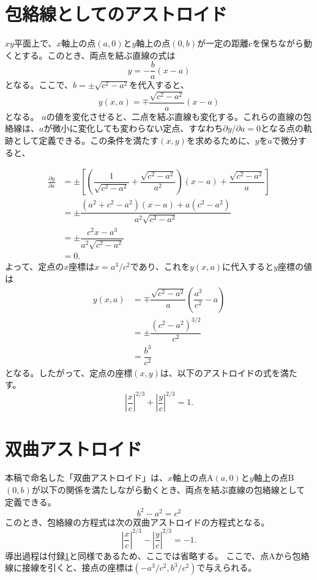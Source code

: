 \documentclass[twocolumn]{article}
\begin{document}
	
\appendix
\newcommand{\pd}[2]{{\frac{\partial #1}{\partial #2}}}
\newcommand{\ilpd}[2]{{{\partial #1}/{\partial #2}}}
\section{包絡線としてのアストロイド} \label{app:astroid}
$xy$平面上で、$x$軸上の点$(a, 0)$と$y$軸上の点$(0, b)$が一定の距離$c$を保ちながら動くとする。このとき、両点を結ぶ直線の式は
$$y=-\dfrac{b}{a}(x-a)$$
となる。ここで、$b=\pm \sqrt{c^2-a^2}$を代入すると、
$$y(x, a) = \mp \dfrac{\sqrt{c^2-a^2}}{a}(x-a)$$
となる。
$a$の値を変化させると、二点を結ぶ直線も変化する。これらの直線の包絡線は、$a$が微小に変化しても変わらない定点、すなわち$\ilpd{y}{a} = 0$となる点の軌跡として定義できる。この条件を満たす$(x, y)$を求めるために、$y$を$a$で微分すると、

$$ \begin{aligned}
	\pd{y}{a} &= \pm\left[\left( \dfrac{1}{\sqrt{c^2-a^2}}+\dfrac{\sqrt{c^2-a^2}}{a^2}\right) (x-a) + \dfrac{\sqrt{c^2-a^2}}{a} \right]\\
	&= \pm \dfrac{(a^2+c^2-a^2)(x-a)+a(c^2-a^2)}{a^2\sqrt{c^2-a^2}}\\
	&= \pm \dfrac{c^2 x - a^3}{a^2 \sqrt{c^2 - a^2}}\\
	&= 0.
\end{aligned}
$$
よって、定点の$x$座標は$x = a^3/c^2$であり、これを$y(x, a)$に代入すると$y$座標の値は
$$ \begin{aligned}
	y(x, a) &= \mp \dfrac{\sqrt{c^2-a^2}}{a}\left(\dfrac{a^3}{c^2}-a\right)\\
	& = \pm \dfrac{\left( c^2- a^2 \right)^{3/2}}{c^2}\\
	& = \dfrac{b^3}{c^2}
\end{aligned}
$$
となる。したがって、定点の座標$(x, y)$は、以下のアストロイドの式を満たす。
$$ \left|\dfrac{x}{c}\right|^{2/3} + \left|\dfrac{y}{c}\right|^{2/3} = 1. $$

\section{双曲アストロイド}\label{app:hyperastroid}
本稿で命名した「双曲アストロイド」は、$x$軸上の点A$(a, 0)$と$y$軸上の点B$(0, b)$が以下の関係を満たしながら動くとき、両点を結ぶ直線の包絡線として定義できる。
$$b^2-a^2=c^2$$
このとき、包絡線の方程式は次の双曲アストロイドの方程式となる。
$$ \left|\dfrac{x}{c}\right|^{2/3} - \left|\dfrac{y}{c}\right|^{2/3} = -1. $$
導出過程は付録\ref{app:astroid}と同様であるため、ここでは省略する。
ここで、点Aから包絡線に接線を引くと、接点の座標は$(-a^3/c^2, b^3/c^2)$で与えられる。
\end{document}
